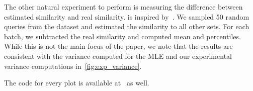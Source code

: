 The other natural experiment to perform is measuring the difference between estimated similarity and real similarity.
 is inspired by~\cite{thorup2013bottom}.
We sampled 50 random queries from the dataset and estimated the similarity to all other sets.
For each batch, we subtracted the real similarity and computed mean and percentiles.
While this is not the main focus of the paper, we note that the results are consistent with the variance computed for the MLE and our experimental variance computations in~\cref{fig:exp_variance}.

The code for every plot is available at~\cite{codes} as well.
